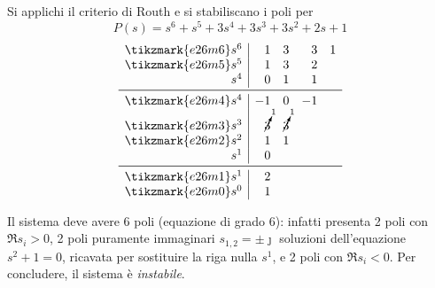 \begin{esercizio} Si applichi il criterio di Routh e si stabiliscano i poli per
\[
	P(s) = s^6 + s^5 + 3s^4 + 3s^3 + 3s^2 + 2s + 1
\]
\[\begin{array}{r|rrrr}
	\tikzmark{e26m6} s^6 &  1 & 3 & 3 & 1	\\
	\tikzmark{e26m5} s^5 &  1 & 3 & 2	\\
			 s^4 &  0 & 1 & 1	\\
	\midrule
	\tikzmark{e26m4} s^4 & -1 & 0 & -1	\\
	\tikzmark{e26m3} s^3 & \cancelto{1}{3} & \cancelto{1}{3} \\
	\tikzmark{e26m2} s^2 &  1 & 1		\\
			 s^1 &  0		\\
	\midrule
	\tikzmark{e26m1} s^1 &  2		\\
	\tikzmark{e26m0} s^0 &  1
\end{array}\]
Il sistema deve avere 6 poli (equazione di grado 6): infatti presenta 2 poli con
\(\Re s_i > 0\), 2 poli puramente immaginari \(s_{1,2} = \pm\jmath\) soluzioni
dell'equazione \(s^2 + 1 = 0\), ricavata per sostituire la riga nulla \(s^1\),
e 2 poli con \(\Re s_i < 0\). Per concludere, il sistema è \emph{instabile}.
\end{esercizio}

